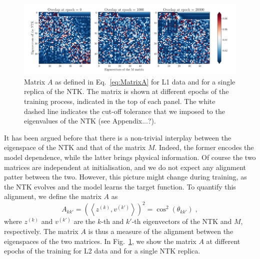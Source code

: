 

\begin{figure}[h!]
  \centering
  \includegraphics[width=1\textwidth]{plots/ntk_pheno/ntk_alignment.pdf}
  \caption{Matrix $A$ as defined in Eq.~\eqref{eq:MatrixA} for L1 data and for a
  single replica of the NTK. The matrix is shown at different epochs of the
  training process, indicated in the top of each panel. The white dashed line
  indicates the cut-off tolerance that we imposed to the eigenvalues of the NTK
  (see Appendix...?).}
  \label{fig:NtkMAlign}
\end{figure}
It has been argued before that there is a non-trivial interplay between the
eigenspace of the NTK and that of the matrix $M$. Indeed, the former encodes the
model dependence, while the latter brings physical information. Of course the
two matrices are independent at initialisation, and we do not expect any
alignment patter between the two. However, this picture might change during
training, as the NTK evolves and the model learns the target function. To
quantify this alignment, we define the matrix $A$ as
\begin{equation}
  A_{kk'} = \left( \left< z^{(k)}, v^{(k')}\right> \right)^2 = \cos^2(\theta_{kk'}) \;,
  \label{eq:MatrixA}
\end{equation}
where $z^{(k)}$ and $v^{(k')}$ are the $k$-th and $k'$-th eigenvectors of the
NTK and $M$, respectively. The matrix $A$ is thus a measure of the alignment
between the eigenspaces of the two matrices. In Fig.~\ref{fig:NtkMAlign}, we
show the matrix $A$ at different epochs of the training for L2 data and for a
single NTK replica.


\FloatBarrier
